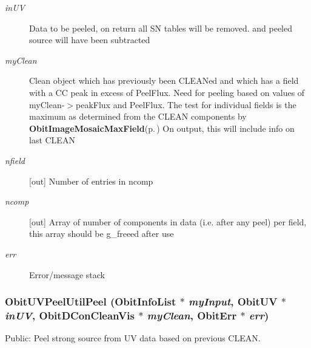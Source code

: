 \begin{Desc}
\begin{description}
\item[{\em in\-UV}]Data to be peeled, on return all SN tables will be removed. and peeled source will have been subtracted \item[{\em my\-Clean}]Clean object which has previously been CLEANed and which has a field with a CC peak in excess of Peel\-Flux. Need for peeling based on values of my\-Clean-$>$peak\-Flux and Peel\-Flux. The test for individual fields is the maximum as determined from the CLEAN components by {\bf Obit\-Image\-Mosaic\-Max\-Field}{\rm (p.\,\pageref{ObitImageMosaic_8c_a30})} On output, this will include info on last CLEAN \item[{\em nfield}][out] Number of entries in ncomp \item[{\em ncomp}][out] Array of number of components in data (i.e. after any peel) per field, this array should be g\_\-freeed after use \item[{\em err}]Error/message stack \end{description}
\end{Desc}
\subsubsection{ Obit\-UVPeel\-Util\-Peel ({\bf Obit\-Info\-List} $\ast$ {\em my\-Input}, {\bf Obit\-UV} $\ast$ {\em in\-UV}, {\bf Obit\-DCon\-Clean\-Vis} $\ast$ {\em my\-Clean}, {\bf Obit\-Err} $\ast$ {\em err})}\label{ObitUVPeelUtil_8h_a0}


Public: Peel strong source from UV data based on previous CLEAN. 

